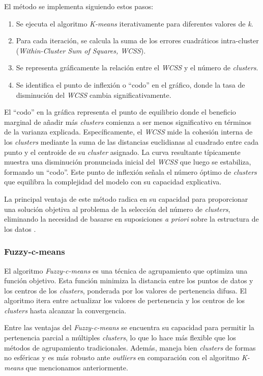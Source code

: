 \documentclass[11pt,a4paper,twoside,openany]{tesis}
\begin{document}
El método se implementa siguiendo estos pasos:
\begin{enumerate}
\item Se ejecuta el algoritmo \emph{K-means} iterativamente para diferentes valores de \emph{k}.
\item Para cada iteración, se calcula la suma de los errores cuadráticos intra-cluster (\emph{Within-Cluster Sum of Squares, WCSS}).
\item Se representa gráficamente la relación entre el \emph{WCSS} y el número de \emph{clusters}.
\item Se identifica el punto de inflexión o ``codo'' en el gráfico, donde la tasa de disminución del \emph{WCSS} cambia significativamente.
\end{enumerate}

El ``codo'' en la gráfica representa el punto de equilibrio donde el beneficio marginal de añadir más \emph{clusters} comienza a ser menos significativo en términos de la varianza explicada. Específicamente, el \emph{WCSS} mide la cohesión interna de los \emph{clusters} mediante la suma de las distancias euclidianas al cuadrado entre cada punto y el centroide de su \emph{cluster} asignado. La curva resultante típicamente muestra una disminución pronunciada inicial del \emph{WCSS} que luego se estabiliza, formando un ``codo''. Este punto de inflexión señala el número óptimo de \emph{clusters} que equilibra la complejidad del modelo con su capacidad explicativa.

La principal ventaja de este método radica en su capacidad para proporcionar una solución objetiva al problema de la selección del número de \emph{clusters}, eliminando la necesidad de basarse en suposiciones \emph{a priori} sobre la estructura de los datos \cite{metodo-codo}.

\newpage
\subsubsection{Fuzzy-c-means} \textbf{ }

El algoritmo \emph{Fuzzy-c-means} es una técnica de agrupamiento que optimiza una función objetivo. Esta función minimiza la distancia entre los puntos de datos y los centros de los \emph{clusters}, ponderada por los valores de pertenencia difusa. El algoritmo itera entre actualizar los valores de pertenencia y los centros de los \emph{clusters} hasta alcanzar la convergencia. 

Entre las ventajas del \emph{Fuzzy-c-means} se encuentra su capacidad para permitir la pertenencia parcial a múltiples \emph{clusters}, lo que lo hace más flexible que los métodos de agrupamiento tradicionales. Además, maneja bien \emph{clusters} de formas no esféricas y es más robusto ante \emph{outliers} en comparación con el algoritmo \emph{K-means} que mencionamos anteriormente.
\end{document}
